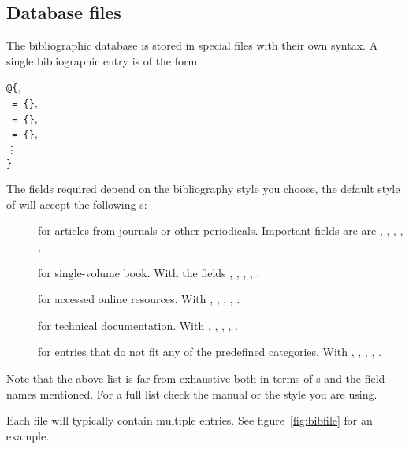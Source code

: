 \subsection{Database files}
The bibliographic database is stored in special  files with their own
syntax. A single bibliographic entry is of the form
\begin{lscommand}
\texttt{@}\texttt{\{},\\
\hspace*{1em}\texttt{ = \{}\texttt{\}},\\
\hspace*{1em}\texttt{ = \{}\texttt{\}},\\
\hspace*{1em}\texttt{ = \{}\texttt{\}},\\
\hspace*{3em}\vdots\\
\texttt{\}}
\end{lscommand}
The fields required depend on the bibliography style you choose,
the default style of  will accept
the following s:
\begin{description}
  \item[] for articles from journals or other periodicals. Important fields are
   are , , ,
  , , .
  \item[] for single-volume book. With the fields
  , , , ,
  .
  \item[] for accessed online resources. With
   , , , , .
  \item[] for technical documentation. With
   , , , , .
  \item[] for entries that do not fit any of the predefined
   categories. With , ,
   , , .
\end{description}
Note that the above list is far from exhaustive both in terms of s and the field names mentioned. For a full list check the 
manual or the style you are using.

Each  file will typically contain multiple entries. See
figure~\ref{fig:bibfile} for an example.

